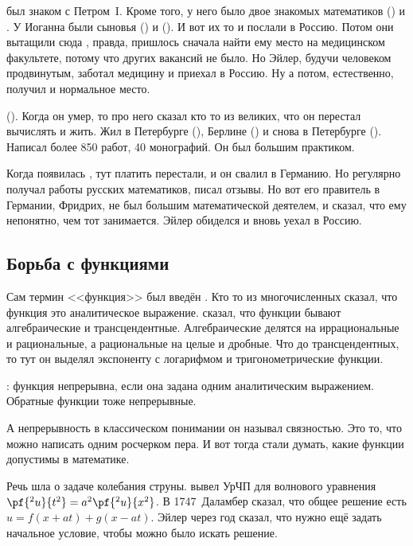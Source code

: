 \documentclass[a4paper,oneside,fleqn,10pt]{article}
\begin{document}
 был знаком с Петром~I. Кроме того, у него было двое знакомых математиков
 () и .
У Иоганна были сыновья  () и 
(). И вот их то и послали в Россию.
Потом они вытащили сюда , правда, пришлось сначала найти ему место на медицинском факультете,
потому что других вакансий не было. Но Эйлер, будучи человеком продвинутым, заботал медицину
и приехал в Россию. Ну а потом, естественно, получил и нормальное место.

 (). Когда он умер, то про него сказал кто то из великих, что он перестал вычислять и жить.
Жил в Петербурге (), Берлине () и снова в Петербурге ().
Написал более 850 работ, 40 монографий. Он был большим практиком.

Когда появилась , тут платить перестали, и он свалил в Германию.
Но регулярно получал работы русских математиков, писал отзывы. Но вот его правитель в Германии, Фридрих,
не был большим математической деятелем, и сказал, что ему непонятно, чем тот занимается.
Эйлер обиделся и вновь уехал в Россию.

\subsection{Борьба с функциями}

Сам термин <<функция>> был введён . Кто то из многочисленных
 сказал, что функция это аналитическое выражение.
 сказал, что функции бывают алгебраические и трансцендентные.
Алгебраические делятся на иррациональные и рациональные, а рациональные на целые и дробные.
Что до трансцендентных, то тут он выделял экспоненту с логарифмом и тригонометрические функции.

: функция непрерывна, если она задана одним аналитическим выражением.
Обратные функции тоже непрерывные.

А непрерывность в классическом понимании он называл связностью. Это то, что можно написать
одним росчерком пера. И вот тогда стали думать, какие функции допустимы в математике.

Речь шла о задаче колебания струны.  вывел УрЧП для волнового уравнения $\pf{^2 u}{t^2} = a^2\pf{^2u}{x^2}$.
В 1747~Даламбер сказал, что общее решение есть $u = f(x+at) + g(x-at)$. Эйлер через год
сказал, что нужно ещё задать начальное условие, чтобы можно было искать решение.
\end{document}
